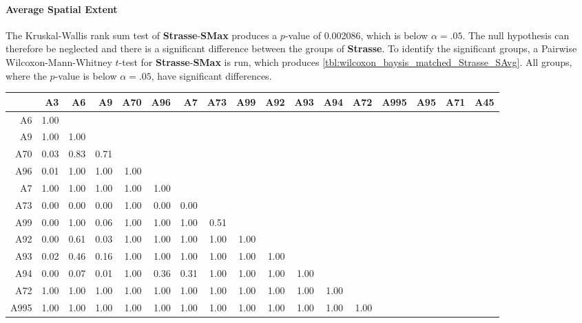 \paragraph{Average Spatial Extent}
The Kruskal-Wallis rank sum test of \textbf{Strasse}-\textbf{SMax} produces a $p$-value of 0.002086, which is below $\alpha=.05$. The null hypothesis can therefore be neglected and there is a significant difference between the groups of \textbf{Strasse}. To identify the significant groups, a Pairwise Wilcoxon-Mann-Whitney $t$-test for \textbf{Strasse}-\textbf{SMax} is run, which produces \autoref{tbl:wilcoxon_baysis_matched_Strasse_SAvg}. All groups, where the $p$-value is below $\alpha=.05$, have significant differences. 
\begin{table}[ht]
	\tiny
	\setlength{\tabcolsep}{4pt}
	\centering
	\begin{tabular}{rrrrrrrrrrrrrrrrr}
		\toprule
	 	& A3 & A6 & A9 & A70 & A96 & A7 & A73 & A99 & A92 & A93 & A94 & A72 & A995 & A95 & A71 & A45 \\ 
		\midrule
		A6 & 1.00 &  &  &  &  &  &  &  &  &  &  &  &  &  &  &  \\ 
	  	A9 & 1.00 & 1.00 &  &  &  &  &  &  &  &  &  &  &  &  &  &  \\ 
	  	A70 & 0.03 & 0.83 & 0.71 &  &  &  &  &  &  &  &  &  &  &  &  &  \\ 
	  	A96 & 0.01 & 1.00 & 1.00 & 1.00 &  &  &  &  &  &  &  &  &  &  &  &  \\ 
	  	A7 & 1.00 & 1.00 & 1.00 & 1.00 & 1.00 &  &  &  &  &  &  &  &  &  &  &  \\ 
	  	A73 & 0.00 & 0.00 & 0.00 & 1.00 & 0.00 & 0.00 &  &  &  &  &  &  &  &  &  &  \\ 
	  	A99 & 0.00 & 1.00 & 0.06 & 1.00 & 1.00 & 1.00 & 0.51 &  &  &  &  &  &  &  &  &  \\ 
	  	A92 & 0.00 & 0.61 & 0.03 & 1.00 & 1.00 & 1.00 & 1.00 & 1.00 &  &  &  &  &  &  &  &  \\ 
	  	A93 & 0.02 & 0.46 & 0.16 & 1.00 & 1.00 & 1.00 & 1.00 & 1.00 & 1.00 &  &  &  &  &  &  &  \\ 
	  	A94 & 0.00 & 0.07 & 0.01 & 1.00 & 0.36 & 0.31 & 1.00 & 1.00 & 1.00 & 1.00 &  &  &  &  &  &  \\ 
	  	A72 & 1.00 & 1.00 & 1.00 & 1.00 & 1.00 & 1.00 & 1.00 & 1.00 & 1.00 & 1.00 & 1.00 &  &  &  &  &  \\ 
	  	A995 & 1.00 & 1.00 & 1.00 & 1.00 & 1.00 & 1.00 & 1.00 & 1.00 & 1.00 & 1.00 & 1.00 & 1.00 &  &  &  &  \\ 

\end{tabular}
\end{table}
